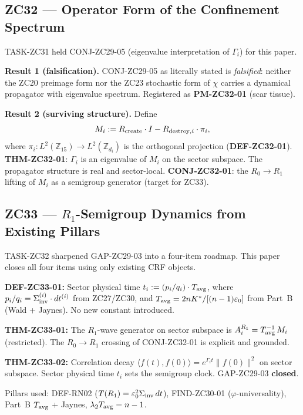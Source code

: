 \documentclass[11pt, a4paper]{article}
\newcommand{\Zft}{\mathbb{Z}_{15}}  %
\newcommand{\Tavg}{T_{\rm avg}}
\newcommand{\Sinv}{\Sigma_{\rm inv}}
\begin{document}
\subsection{ZC32 --- Operator Form of the Confinement Spectrum}

\begin{zcbox}[title={ZC32-v2: THM-ZC32-01 --- $M_i$ Spectral Decomposition; PM-ZC32-01}]
\sloppy
TASK-ZC31 held CONJ-ZC29-05 (eigenvalue interpretation of $\Gamma_i$)
for this paper.

\textbf{Result 1 (falsification).} CONJ-ZC29-05 as literally stated is
\emph{falsified}: neither the ZC20 preimage form nor the ZC23 stochastic
form of $\chi$ carries a dynamical propagator with eigenvalue spectrum.
Registered as \textbf{PM-ZC32-01} (scar tissue).

\textbf{Result 2 (surviving structure).} Define
\[
  M_i := R_{\rm create}\cdot I - R_{{\rm destroy},i}\cdot\pi_i,
\]
where $\pi_i: L^2(\Zft)\to L^2(\mathbb{Z}_{d_i})$ is the orthogonal
projection (\textbf{DEF-ZC32-01}).
\textbf{THM-ZC32-01}: $\Gamma_i$ is an eigenvalue of $M_i$ on the
sector subspace. The propagator structure is real and sector-local.
\textbf{CONJ-ZC32-01}: the $R_0\to R_1$ lifting of $M_i$ as a
semigroup generator (target for ZC33).
\end{zcbox}

\subsection{ZC33 --- $R_1$-Semigroup Dynamics from Existing Pillars}

\begin{zcbox}[title={ZC33-v2: THM-ZC33-01/02 --- GAP-ZC29-03 Closed; Sector Physical Time}]
\sloppy
TASK-ZC32 sharpened GAP-ZC29-03 into a four-item roadmap.
This paper closes all four items using only existing CRF objects.

\textbf{DEF-ZC33-01:} Sector physical time
$t_i := (p_i/q_i)\cdot\Tavg$, where $p_i/q_i =
\Sinv^{(i)}\cdot dt^{(i)}$ from ZC27/ZC30, and $\Tavg =
2nK^*/[(n-1)\varepsilon_0]$ from Part~B (Wald + Jaynes).
No new constant introduced.

\textbf{THM-ZC33-01:} The $R_1$-wave generator on sector subspace is
$A_i^{R_1} = \Tavg^{-1}\,M_i$ (restricted). The $R_0\to R_1$ crossing
of CONJ-ZC32-01 is explicit and grounded.

\textbf{THM-ZC33-02:} Correlation decay
$\langle f(t),f(0)\rangle = e^{\Gamma_i t}\|f(0)\|^2$
on sector subspace. Sector physical time $t_i$ sets the semigroup
clock. GAP-ZC29-03 \textbf{closed}.

Pillars used: DEF-RN02 ($T(R_1) = \varepsilon_0^2\Sinv\,dt$),
FIND-ZC30-01 ($\varphi$-universality), Part~B $\Tavg$ + Jaynes,
$\lambda_2\Tavg = n-1$.
\end{zcbox}
\end{document}
